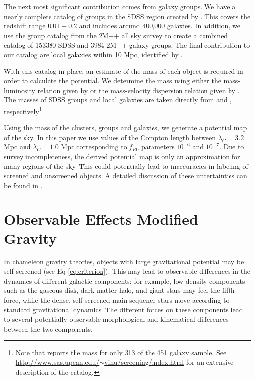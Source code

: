 \documentclass[useAMS,usenatbib,twocolumn]{mn2e}
\begin{document}
The next most significant contribution comes from galaxy groups. We have a
nearly complete catalog of groups in the SDSS region created by
\citet{yan07}. This covers the redshift range $0.01-0.2$ and includes around
400,000 galaxies. In addition, we use the group catalog from the 2M++ all
sky survey \citep{lav011} to create a combined catalog of
153380 SDSS and 3984 2M++ galaxy groups.
The final contribution to our catalog are
local galaxies within 10 Mpc, identified by \citet{kar04}. 

With this catalog in place, an estimate of the mass of each object
is required in order to calculate the potential.
We determine the mass using either the mass-luminosity relation given by
\citet{rei02} or the mass-velocity dispersion relation given by \citet{evr08}.
The masses of SDSS groups and local galaxies are taken directly from
\citet{yan07} and \citet{kar04}, respectively\footnote{Note
that \citet{kar04} reports the mass for only 313 of the 451 galaxy sample.
See \href{http://www.sas.upenn.edu/~vinu/screening/index.html}{
http://www.sas.upenn.edu/$\sim$vinu/screening/index.html} for an extensive
description of the catalog.}.

Using the mass of the clusters, groups and galaxies, we generate a
potential map of the sky.
In this paper we use values of the Compton length between $\lambda_C
= 3.2$ Mpc and  $\lambda_C = 1.0$ Mpc corresponding to $f_{R0}$ parameters
$10^{-6}$ and $10^{-7}$.  
Due to survey incompleteness, the derived potential map
is only an approximation for many regions of the sky. This could potentially
lead to inaccuracies in labeling of screened and unscreened objects.
A detailed discussion of these uncertainties
can be found in \citet{cabre2012}. 
 
\section{Observable Effects Modified Gravity}
In chameleon gravity theories, objects with large gravitational potential
may be self-screened (see Eq \ref{eq:criterion}).  This may lead to observable
differences in the dynamics of different galactic components: for example,
low-density components such as the gaseous disk, dark matter halo, and giant
stars may feel the fifth force, while the dense, self-screened main sequence
stars move according to standard gravitational dynamics.
The different forces on these components lead to several potentially observable
morphological and kinematical differences between the two components. 
\end{document}
